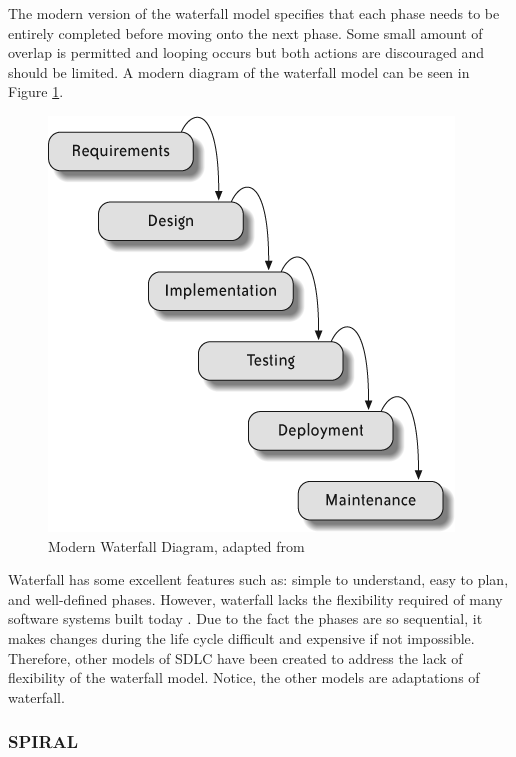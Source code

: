 \documentclass[SDSUThesis.tex]{subfiles}
\begin{document}
        The modern version of the waterfall model specifies that each phase needs 
        to be entirely completed before moving
        onto the next phase.  Some small amount of overlap is permitted and looping 
        occurs but both actions are discouraged and should be limited.  
        A modern diagram of the waterfall model can be seen in Figure \ref{fig:waterfall}.
        \begin{figure}[here]
            \centering
            \includegraphics[scale=.6]{images/waterfall.png}
            \caption[Modern Waterfall]
                {Modern Waterfall Diagram, adapted from \cite{Hibbs2009} }
            \label{fig:waterfall}
        \end{figure}
        
        Waterfall has some excellent features such as: simple to understand,
        easy to plan, and well-defined phases. However, waterfall lacks
        the flexibility required of many software systems built today
        \cite{Maheshwari2012}.  Due to the fact the phases are so sequential,
        it makes changes during the life cycle difficult and expensive if 
        not impossible. Therefore, other models of SDLC have been created
        to address the lack of flexibility of the waterfall model. Notice,
        the other models are  adaptations of waterfall.
    
    
    \subsubsection{SPIRAL}
        
\end{document}
